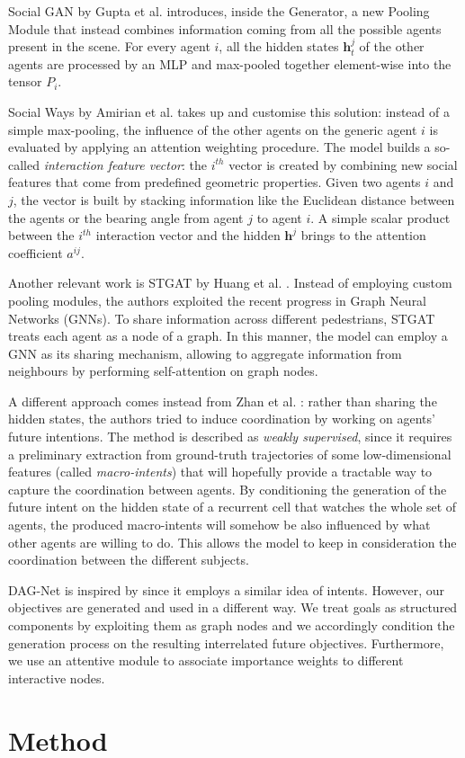 \documentclass[10pt,a4paper,conference]{IEEEtran}
\begin{document}
Social GAN by Gupta et al. \cite{sgan} introduces, inside the Generator, a new Pooling Module that instead combines information coming from all the possible agents present in the scene. For every agent $i$, all the hidden states $\mathbf{h}_{t}^{j}$ of the other agents are processed by an MLP and max-pooled together element-wise into the tensor $P_{i}$.

Social Ways by Amirian et al. \cite{socialways} takes up and customise this solution: instead of a simple max-pooling, the influence of the other agents on the generic agent $i$ is evaluated by applying an attention weighting procedure. The model builds a so-called \textit{interaction feature vector}: the $i^{th}$ vector is created by combining new social features that come from predefined geometric properties. Given two agents $i$ and $j$, the vector is built by stacking information like the Euclidean distance between the agents or the bearing angle from agent $j$ to agent $i$. A simple scalar product between the $i^{th}$ interaction vector and the hidden $\mathbf{h}^{j}$ brings to the attention coefficient $a^{ij}$.


Another relevant work is STGAT by Huang et al. \cite{stgat}. Instead of employing custom pooling modules, the authors exploited the recent progress in Graph Neural Networks (GNNs). To share information across different pedestrians, STGAT treats each agent as a node of a graph. In this manner, the model can employ a GNN \cite{gat} as its sharing mechanism, allowing to aggregate information from neighbours by performing self-attention \cite{attention_is_all_you_need} on graph nodes.

A different approach comes instead from Zhan et al. \cite{weeksup}: rather than sharing the hidden states, the authors tried to induce coordination by working on agents' future intentions. The method is described as \textit{weakly supervised}, since it requires a preliminary extraction from ground-truth trajectories of some low-dimensional features (called \textit{macro-intents}) that will hopefully provide a tractable way to capture the coordination between agents. By conditioning the generation of the future intent on the hidden state of a recurrent cell that watches the whole set of agents, the produced macro-intents will somehow be also influenced by what other agents are willing to do. This allows the model to keep in consideration the coordination between the different subjects.

DAG-Net is inspired by \cite{weeksup} since it employs a similar idea of intents. However, our objectives are generated and used in a different way. We treat goals as structured components by exploiting them as graph nodes and we accordingly condition the generation process on the resulting interrelated future objectives. Furthermore, we use an attentive module to associate importance weights to different interactive nodes. \section{Method}
\end{document}
